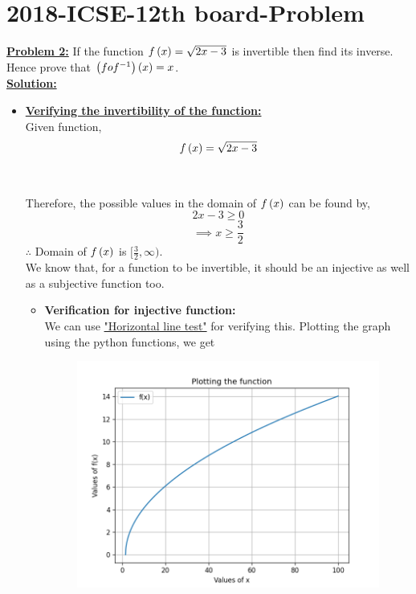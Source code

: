 \documentclass[journal,12pt,twocolumn]{IEEEtran}
\begin{document}
	\section{2018-ICSE-12th board-Problem}
\textbf{\underline{Problem 2:}} If the function $f\left(x\right)=\sqrt{2x-3}$ is invertible then find its inverse. Hence prove that $\left(fof^{-1}\right)\left(x\right)=x$.\\
	\textbf{\underline{Solution:} }
	\begin{itemize}
	\item
	\textbf{\underline{Verifying the invertibility of the function:}}\\
	Given function,
	\begin{equation} \label{eq:1.0}
	f\left(x\right) = \sqrt{2x-3}
	\end{equation}
	\begin{center}
\\
\end{center}
	Therefore, the possible values in the domain of $f\left(x\right)$ can be found by,
	\begin{equation}
	2x - 3 \geq 0
	\end{equation}
	\begin{equation}
	\implies x \geq \frac{3}{2}
	\end{equation}
	$\therefore$ Domain of $f\left(x\right)$ is $[\frac{3}{2},\infty)$.\\
	We know that, for a function to be invertible, it should be an injective as well as a subjective function too.
	\begin{itemize}
	\item
	\textbf{Verification for injective function:}\\
	We can use \underline{"Horizontal line test"} for verifying this. Plotting the graph using the python functions, we get
	\begin{figure}[!ht] 
		\centering
		\includegraphics[width=\columnwidth]{Fig_1}

\end{figure}
\end{itemize}
\end{itemize}
\end{document}
